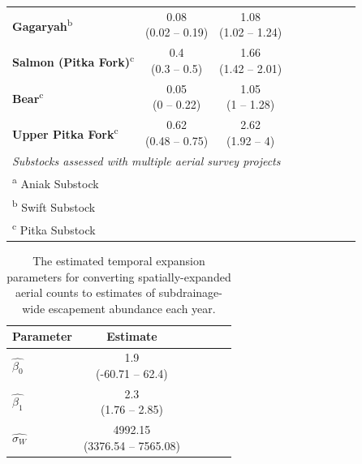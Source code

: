 \documentclass[12pt,]{book}
\theoremstyle{definition}
\theoremstyle{definition}
\theoremstyle{definition}
\theoremstyle{remark}
\begin{document}
\begin{table}
\begin{tabular}[t]{lcclcclcc}
\textbf{Gagaryah}\textsuperscript{b} & \makecell[c]{0.08\\(0.02 -- 0.19)} & \makecell[c]{1.08\\(1.02 -- 1.24)}\\
\textbf{Salmon (Pitka Fork)}\textsuperscript{c} & \makecell[c]{0.4\\(0.3 -- 0.5)} & \makecell[c]{1.66\\(1.42 -- 2.01)}\\
\textbf{Bear}\textsuperscript{c} & \makecell[c]{0.05\\(0 -- 0.22)} & \makecell[c]{1.05\\(1 -- 1.28)}\\
\textbf{Upper Pitka Fork}\textsuperscript{c} & \makecell[c]{0.62\\(0.48 -- 0.75)} & \makecell[c]{2.62\\(1.92 -- 4)}\\
\bottomrule
\multicolumn{9}{l}{\textit{Substocks assessed with multiple aerial survey projects}}\\
\multicolumn{9}{l}{\textsuperscript{a} Aniak Substock}\\
\multicolumn{9}{l}{\textsuperscript{b} Swift Substock}\\
\multicolumn{9}{l}{\textsuperscript{c} Pitka Substock}\\
\end{tabular}
\end{table}

\clearpage

\begin{table}[H]

\caption{\label{tab:temp-expand-table}The estimated temporal expansion parameters for converting spatially-expanded aerial counts to estimates of subdrainage-wide escapement abundance each year.}
\centering
\begin{tabular}[t]{lcclcc}
\toprule
\textbf{Parameter} & \textbf{Estimate}\\
\midrule
$\hat{\beta_0}$ & \makecell[c]{1.9\\(-60.71 -- 62.4)}\\
$\hat{\beta_1}$ & \makecell[c]{2.3\\(1.76 -- 2.85)}\\
$\hat{\sigma_W}$ & \makecell[c]{4992.15\\(3376.54 -- 7565.08)}\\
\bottomrule
\end{tabular}
\end{table}
\end{document}
